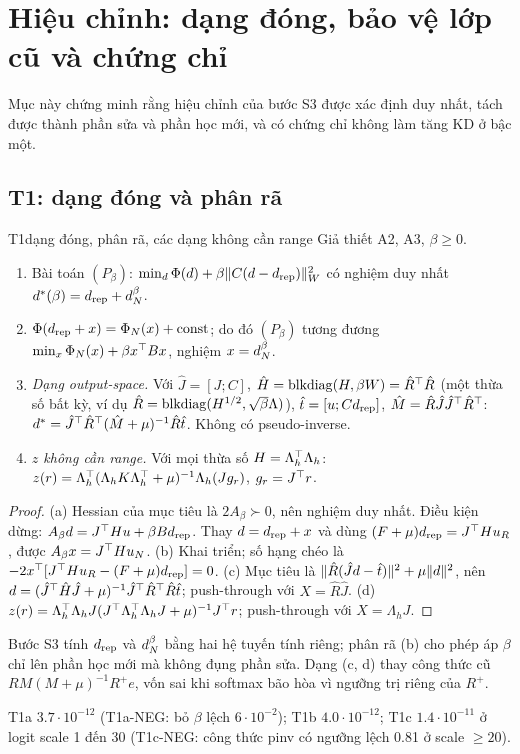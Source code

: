 \section{Hiệu chỉnh: dạng đóng, bảo vệ lớp cũ và chứng chỉ}\label{sec:core}

Mục này chứng minh rằng hiệu chỉnh của bước S3 được xác định duy nhất, tách được thành phần sửa và phần học mới, và có chứng chỉ không làm tăng KD ở bậc một.

\subsection{T1: dạng đóng và phân rã}

\begin{namedthm}{T1}{dạng đóng, phân rã, các dạng không cần range}
Giả thiết A2, A3, $\beta\ge0$.
\begin{enumerate}[label=(\alph*)]
\item Bài toán $(P_\beta)$: $\min_d\Phi(d)+\beta\lVert C(d-d_{\mathrm{rep}})\rVert_W^2$ có nghiệm duy nhất $d^*(\beta)=d_{\mathrm{rep}}+d_N^{\beta}$.
\item $\Phi(d_{\mathrm{rep}}+x)=\Phi_N(x)+\mathrm{const}$; do đó $(P_\beta)$ tương đương $\min_x\Phi_N(x)+\beta x^{\top} Bx$, nghiệm $x=d_N^{\beta}$.
\item \emph{Dạng output-space.} Với $\hat J=[J;C]$, $\hat H=\operatorname{blkdiag}(H,\beta W)=\hat R^{\top}\hat R$ (một thừa số bất kỳ, ví dụ $\hat R=\operatorname{blkdiag}(H^{1/2},\sqrt\beta\Lambda)$), $\hat t=[u;Cd_{\mathrm{rep}}]$, $\hat M=\hat R\hat J\hat J^{\top}\hat R^{\top}$: $d^*=\hat J^{\top}\hat R^{\top}(\hat M+\mu)^{-1}\hat R\hat t$. Không có pseudo-inverse.
\item \emph{$z$ không cần range.} Với mọi thừa số $H=\Lambda_h^{\top}\Lambda_h$: $z(r)=\Lambda_h^{\top}(\Lambda_hK\Lambda_h^{\top}+\mu)^{-1}\Lambda_h(Jg_r)$, $g_r=J^{\top} r$.
\end{enumerate}
\end{namedthm}
\begin{proof}
(a) Hessian của mục tiêu là $2A_\beta\succ0$, nên nghiệm duy nhất. Điều kiện dừng: $A_\beta d=J^{\top} Hu+\beta Bd_{\mathrm{rep}}$. Thay $d=d_{\mathrm{rep}}+x$ và dùng $(F+\mu)d_{\mathrm{rep}}=J^{\top} Hu_R$, được $A_\beta x=J^{\top} Hu_N$.
(b) Khai triển; số hạng chéo là $-2x^{\top}[J^{\top} Hu_R-(F+\mu)d_{\mathrm{rep}}]=0$.
(c) Mục tiêu là $\lVert \hat R(\hat Jd-\hat t)\rVert^2+\mu\lVert d\rVert^2$, nên $d=(\hat J^{\top}\hat H\hat J+\mu)^{-1}\hat J^{\top}\hat R^{\top}\hat R\hat t$; push-through với $X=\hat R\hat J$.
(d) $z(r)=\Lambda_h^{\top}\Lambda_hJ(J^{\top}\Lambda_h^{\top}\Lambda_hJ+\mu)^{-1}J^{\top} r$; push-through với $X=\Lambda_hJ$.
\end{proof}
\begin{hequa}
Bước S3 tính $d_{\mathrm{rep}}$ và $d_N^{\beta}$ bằng hai hệ tuyến tính riêng; phân rã (b) cho phép áp $\beta$ chỉ lên phần học mới mà không đụng phần sửa. Dạng (c, d) thay công thức cũ $RM(M+\mu)^{-1}R^+e$, vốn sai khi softmax bão hòa vì ngưỡng trị riêng của $R^+$.
\end{hequa}
\begin{kiem}
T1a $3.7\cdot10^{-12}$ (T1a-NEG: bỏ $\beta$ lệch $6\cdot10^{-2}$); T1b $4.0\cdot10^{-12}$; T1c $1.4\cdot10^{-11}$ ở logit scale 1 đến 30 (T1c-NEG: công thức pinv có ngưỡng lệch 0.81 ở scale $\ge20$).
\end{kiem}

